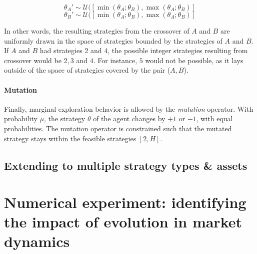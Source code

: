 \documentclass{article}
\begin{document}
\begin{equation}
    \theta_A' \sim \mathcal{U}([\min(\theta_A; \theta_B), \max(\theta_A; \theta_B)] 
\end{equation}
\begin{equation}
    \theta_B' \sim \mathcal{U}([\min(\theta_A; \theta_B), \max(\theta_A; \theta_B)] 
\end{equation}

In other words, the resulting strategies from the crossover of $A$ and $B$ are uniformly drawn in the space of strategies bounded by the strategies of $A$ and $B$. If $A$ and $B$ had strategies $2$ and $4$, the possible integer strategies resulting from crossover would be $2, 3$ and $4$. For instance, $5$ would not be possible, as it lays outside of the space of strategies covered by the pair ($A,B$).\\

\paragraph{Mutation} Finally, marginal exploration behavior is allowed by the \textit{mutation} operator. With probability $\mu$, the strategy $\theta$ of the agent changes by $+1$ or $-1$, with equal probabilities. The mutation operator is constrained such that the mutated strategy stays within the feasible strategies $[2, H]$. 



\subsection{Extending to multiple strategy types \& assets}

\section{Numerical experiment: identifying the impact of evolution in market dynamics}


\end{document}
